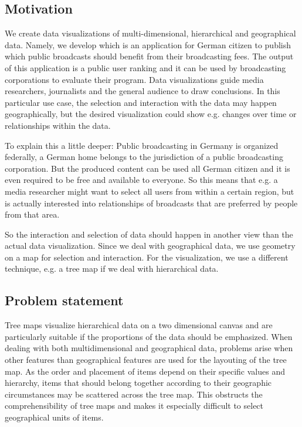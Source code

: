 \documentclass{article}
\begin{document}

\subsection{Motivation}

We create data visualizations of multi-dimensional, hierarchical and geographical data.
Namely, we develop \rufu{} which is an application for German citizen to publish which public broadcasts should benefit from their broadcasting fees.
The output of this application is a public user ranking and it can be used by broadcasting corporations to evaluate their program.
Data visualizations guide media researchers, journalists and the general audience to draw conclusions.
In this particular use case, the selection and interaction with the data may happen geographically, but the desired visualization could show e.g. changes over time or relationships within the data.

To explain this a little deeper:
Public broadcasting in Germany is organized federally, a German home belongs to the jurisdiction of a public broadcasting corporation.
But the produced content can be used all German citizen and it is even required to be free and available to everyone.
So this means that e.g. a media researcher might want to select all users from within a certain region, but is actually interested into relationships of broadcasts that are preferred by people from that area.

So the interaction and selection of data should happen in another view than the actual data visualization.
Since we deal with geographical data, we use geometry on a map for selection and interaction.
For the visualization, we use a different technique, e.g. a tree map if we deal with hierarchical data.

\subsection{Problem statement}


Tree maps visualize hierarchical data on a two dimensional canvas and are particularly suitable if the proportions of the data should be emphasized.
When dealing with both multidimensional and geographical data, problems arise when other features than geographical features are used for the layouting of the tree map.
As the order and placement of items depend on their specific values and hierarchy, items that should belong together according to their geographic circumstances may be scattered across the tree map.
This obstructs the comprehensibility of tree maps and makes it especially difficult to select geographical units of items.
\end{document}
